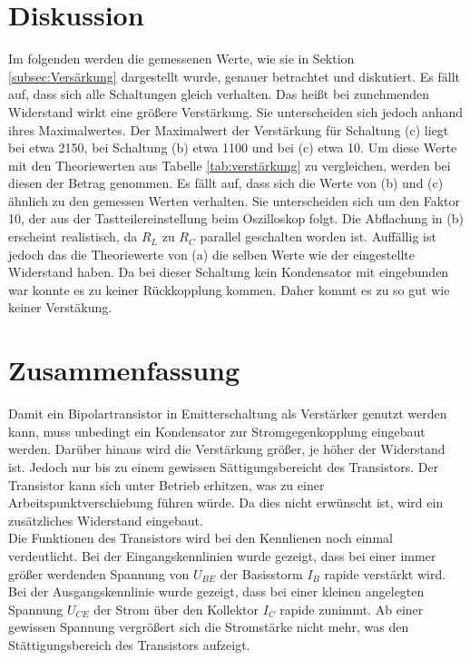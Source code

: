 \documentclass[a4paper,usenatbib]{aspdoc}
\begin{document}
            
    \section{Diskussion}\label{sec:discussion}
        Im folgenden werden die gemessenen Werte, wie sie in Sektion \ref{subsec:Versärkung} dargestellt wurde, genauer betrachtet und diskutiert. Es fällt auf, dass sich alle Schaltungen gleich verhalten. Das heißt bei zunehmenden Widerstand wirkt eine größere Verstärkung. Sie unterscheiden sich jedoch anhand ihres Maximalwertes. Der Maximalwert der Verstärkung für Schaltung (c) liegt bei etwa 2150, bei Schaltung (b) etwa 1100 und bei (c) etwa 10. Um diese Werte mit den Theoriewerten aus Tabelle \ref{tab:verstärkung} zu vergleichen, werden bei diesen der Betrag genommen. Es fällt auf, dass sich die Werte von (b) und (c) ähnlich zu den gemessen Werten verhalten. Sie unterscheiden sich um den Faktor 10, der aus der Tastteilereinstellung beim Oszilloskop folgt. Die Abflachung in (b) erscheint realistisch, da $R_L$ zu $R_C$ parallel geschalten worden ist. Auffällig ist jedoch das die Theoriewerte von (a) die selben Werte wie der eingestellte Widerstand haben. Da bei dieser Schaltung kein Kondensator mit eingebunden war konnte es zu keiner Rückkopplung kommen. Daher kommt es zu so gut wie keiner Verstäkung. 
      
    \section{Zusammenfassung}
        Damit ein Bipolartransistor in Emitterschaltung als Verstärker genutzt werden kann, muss unbedingt ein Kondensator zur Stromgegenkopplung eingebaut werden. Darüber hinaus wird die Verstärkung größer, je höher der Widerstand ist. Jedoch nur bis zu einem gewissen Sättigungsbereicht des Transistors. Der Transistor kann sich unter Betrieb erhitzen, was zu einer Arbeitspunktverschiebung führen würde. Da dies nicht erwünscht ist, wird ein zusätzliches Widerstand eingebaut.\\
        Die Funktionen des Transistors wird bei den Kennlienen noch einmal verdeutlicht. Bei der Eingangskennlinien wurde gezeigt, dass bei einer immer größer werdenden Spannung von $U_{BE}$ der Basisstorm $I_B$ rapide verstärkt wird. Bei der Ausgangskennlinie wurde gezeigt, dass bei einer kleinen angelegten Spannung $U_{CE}$ der Strom über den Kollektor $I_C$ rapide zunimmt. Ab einer gewissen Spannung vergrößert sich die Stromstärke nicht mehr, was den Stättigungsbereich des Transistors aufzeigt. 
        
\end{document}
